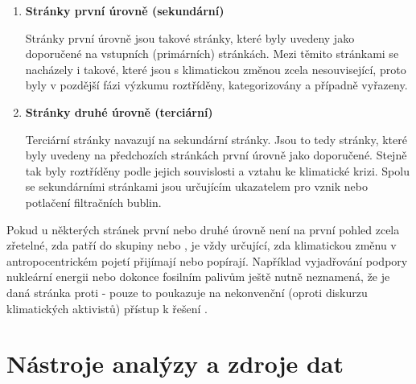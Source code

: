 \begin{enumerate}
        Stránky  jsou charakterizovány zejména tím, že se většinou jedná o stránky známých organizací (např. Greenpeace, NASA, Nature). Ale také jsou tyto stránky z větší části nositeli „modré fajfky“, která je oficiálním označením Facebooku pro pravost určité stránky. Ne ve smyslu pravosti informací, ale ve smyslu identity dané osoby či organizace. Stejné označení dostala i stránka CFACT, která se staví proti klimatické krizi.). I mezi vstupními stránkami  klimatickou krizi se nachází stránky vyjadřující svůj postoj. Například: Climate Change Is Real\footnote{Klimatická změna je opravdová.}. 
        
      \item \textbf{Stránky první úrovně (sekundární)} 
      
      Stránky první úrovně jsou takové stránky, které byly uvedeny jako doporučené na vstupních (primárních) stránkách. Mezi těmito stránkami se nacházely i takové, které jsou s klimatickou změnou zcela nesouvisející, proto byly v pozdější fázi výzkumu roztříděny, kategorizovány a případně vyřazeny.
      
      \item \textbf{Stránky druhé úrovně (terciární)} 
      
      Terciární stránky navazují na sekundární stránky. Jsou to tedy stránky, které byly uvedeny na předchozích stránkách první úrovně jako doporučené. Stejně tak byly roztříděny podle jejich souvislosti a vztahu ke klimatické krizi. Spolu se sekundárními stránkami jsou určujícím ukazatelem pro vznik nebo potlačení filtračních bublin. 
      \end{enumerate}
    
      Pokud u některých stránek první nebo druhé úrovně není na první pohled zcela zřetelné, zda patří do skupiny  nebo , je vždy určující, zda klimatickou změnu v antropocentrickém pojetí přijímají nebo popírají. Například vyjadřování podpory nukleární energii nebo dokonce fosilním palivům ještě nutně neznamená, že je daná stránka proti - pouze to poukazuje na nekonvenční (oproti diskurzu klimatických aktivistů) přístup k řešení \citep{plumer_fountain_albeck-ripka_2018,carrington_2020}.
  
\section{Nástroje analýzy a zdroje dat}
\label{sec:nastroje-analyzy}

